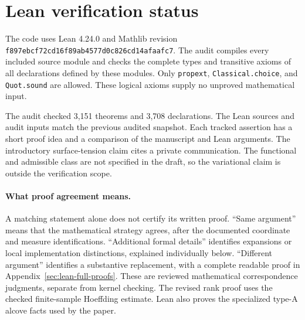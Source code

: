 \clearpage\appendix\section{Lean verification status}\label{sec:lean-status}

The code uses Lean 4.24.0 and Mathlib revision \texttt{f897ebcf72cd16f89ab4577d0c826cd14afaafc7}. The audit compiles every included source module and checks the complete types and transitive axioms of all declarations defined by these modules. Only \texttt{propext}, \texttt{Classical.choice}, and \texttt{Quot.sound} are allowed. These logical axioms supply no unproved mathematical input.

The audit checked 3,151 theorems and 3,708 declarations. The Lean sources and audit inputs match the previous audited snapshot. Each tracked assertion has a short proof idea and a comparison of the manuscript and Lean arguments. The introductory surface-tension claim cites a private communication. The functional and admissible class are not specified in the draft, so the variational claim is outside the verification scope.

\paragraph{What proof agreement means.} A matching statement alone does not certify its written proof. ``Same argument'' means that the mathematical strategy agrees, after the documented coordinate and measure identifications. ``Additional formal details'' identifies expansions or local implementation distinctions, explained individually below. ``Different argument'' identifies a substantive replacement, with a complete readable proof in Appendix~\ref{sec:lean-full-proofs}. These are reviewed mathematical correspondence judgments, separate from kernel checking. The revised rank proof uses the checked finite-sample Hoeffding estimate. Lean also proves the specialized type-A alcove facts used by the paper.

